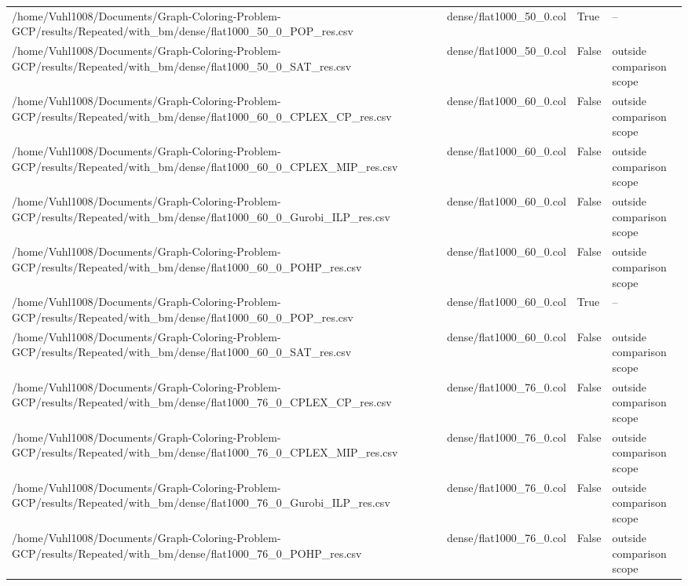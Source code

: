 \begin{table}[htbp]
\begin{tabular}{llll}
/home/Vuhl1008/Documents/Graph-Coloring-Problem-GCP/results/Repeated/with\_bm/dense/flat1000\_50\_0\_POP\_res.csv & dense/flat1000\_50\_0.col & True & -- \\
/home/Vuhl1008/Documents/Graph-Coloring-Problem-GCP/results/Repeated/with\_bm/dense/flat1000\_50\_0\_SAT\_res.csv & dense/flat1000\_50\_0.col & False & outside comparison scope \\
/home/Vuhl1008/Documents/Graph-Coloring-Problem-GCP/results/Repeated/with\_bm/dense/flat1000\_60\_0\_CPLEX\_CP\_res.csv & dense/flat1000\_60\_0.col & False & outside comparison scope \\
/home/Vuhl1008/Documents/Graph-Coloring-Problem-GCP/results/Repeated/with\_bm/dense/flat1000\_60\_0\_CPLEX\_MIP\_res.csv & dense/flat1000\_60\_0.col & False & outside comparison scope \\
/home/Vuhl1008/Documents/Graph-Coloring-Problem-GCP/results/Repeated/with\_bm/dense/flat1000\_60\_0\_Gurobi\_ILP\_res.csv & dense/flat1000\_60\_0.col & False & outside comparison scope \\
/home/Vuhl1008/Documents/Graph-Coloring-Problem-GCP/results/Repeated/with\_bm/dense/flat1000\_60\_0\_POHP\_res.csv & dense/flat1000\_60\_0.col & False & outside comparison scope \\
/home/Vuhl1008/Documents/Graph-Coloring-Problem-GCP/results/Repeated/with\_bm/dense/flat1000\_60\_0\_POP\_res.csv & dense/flat1000\_60\_0.col & True & -- \\
/home/Vuhl1008/Documents/Graph-Coloring-Problem-GCP/results/Repeated/with\_bm/dense/flat1000\_60\_0\_SAT\_res.csv & dense/flat1000\_60\_0.col & False & outside comparison scope \\
/home/Vuhl1008/Documents/Graph-Coloring-Problem-GCP/results/Repeated/with\_bm/dense/flat1000\_76\_0\_CPLEX\_CP\_res.csv & dense/flat1000\_76\_0.col & False & outside comparison scope \\
/home/Vuhl1008/Documents/Graph-Coloring-Problem-GCP/results/Repeated/with\_bm/dense/flat1000\_76\_0\_CPLEX\_MIP\_res.csv & dense/flat1000\_76\_0.col & False & outside comparison scope \\
/home/Vuhl1008/Documents/Graph-Coloring-Problem-GCP/results/Repeated/with\_bm/dense/flat1000\_76\_0\_Gurobi\_ILP\_res.csv & dense/flat1000\_76\_0.col & False & outside comparison scope \\
/home/Vuhl1008/Documents/Graph-Coloring-Problem-GCP/results/Repeated/with\_bm/dense/flat1000\_76\_0\_POHP\_res.csv & dense/flat1000\_76\_0.col & False & outside comparison scope \\

\end{tabular}
\end{table}
